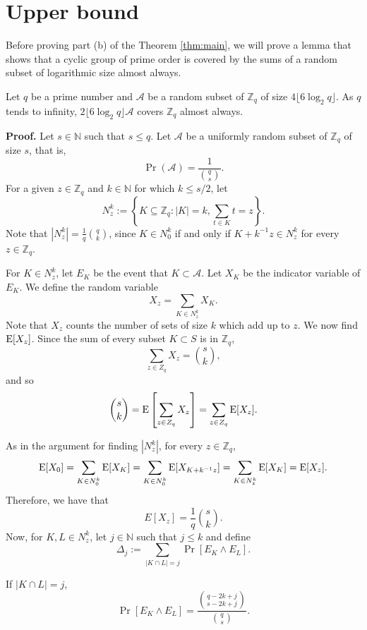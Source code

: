 \section{Upper bound}\label{sec:results:upperbound}
Before proving part (b) of the Theorem \ref{thm:main}, we will prove a lemma that shows that a cyclic group of prime order is covered by the sums of a random subset of logarithmic size almost always.
\begin{lemma}\label{lem:sumset}
    Let $q$ be a prime number and $\mathcal{A}$ be a random subset of $\mathbb{Z}_q$ of size $4\lfloor6\log_2 q\rfloor$. As $q$ tends to infinity, $2\lfloor6\log_2 q\rfloor \mathcal{A}$ covers $\mathbb{Z}_q$ almost always. 
\end{lemma}

\textbf{Proof. } Let $s \in \mathbb{N}$ such that $s\leq q$. Let $\mathcal{A}$ be a uniformly random subset of $\mathbb{Z}_q$ of size $s$, that is, 
\[\Pr(\mathcal{A}) = \frac{1}{\binom{q}{s}}.\]
For a given $z \in \mathbb{Z}_q$ and $k \in \mathbb{N}$ for which $k \leq s/2$, let 
\[N_z^k := \left\{K \subseteq \mathbb{Z}_q: |K| = k, \sum_{t \in K} t = z\right\}.\]
Note that $|N_z^k| = \frac{1}{q}{\binom{q}{k}}$, since $K \in N_0^k$ if and only if $K + k^{-1}z \in N_z^k$ for every $z \in \mathbb{Z}_q$.\par
For $K \in N_z^k$, let $E_K$ be the event that $K \subset\mathcal{A}$. Let $X_K$ be the indicator variable of $E_K$.
We define the random variable 
\[X_z = \sum_{K \in N_z^k} X_K.\]
Note that $X_z$ counts the number of sets of size $k$ which add up to $z$. We now find $\mathrm{E}[X_z]$. Since the sum of every subset $K \subset S$ is in $\mathbb{Z}_q$,
\[\sum_{z \in Z_q} X_z = {\binom{s}{k}},\]
and so
\[\binom{s}{k} = \mathrm{E}\left[\sum_{z \in Z_q} X_z\right] =  \sum_{z \in Z_q} \mathrm{E}[X_z].\]\par
As in the argument for finding $|N_z^k|$, for every $z \in \mathbb{Z}_q$, 
\[\mathrm{E}[X_0] = \sum_{K \in N_0^k}\mathrm{E}[X_K] = \sum_{K \in N_0^k} \mathrm{E}[X_{K + k^{-1}z}] = \sum_{K \in N_z^k} \mathrm{E}[X_K] = \mathrm{E}[X_z].\]
Therefore, we have that
\begin{equation}\label{eq:upperbound:expected}
E[X_z] = \frac{1}{q} {\binom{s}{k}}.
\end{equation}
Now, for $K, L \in N_z^k$, let $j \in \mathbb{N}$ such that $j \leq k$ and define
\[\Delta_j := \sum_{|K \cap L| = j} \Pr[E_K \land E_L].\]
\par 
If $|K \cap L| = j$,
\[\Pr[E_K \land E_L] = \frac{\binom{q - 2k + j}{s - 2k + j}}{\binom{q}{s}}.\]
\par
